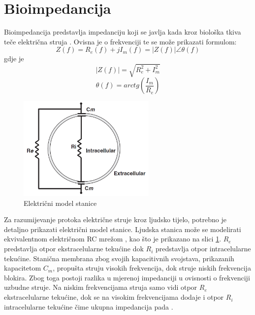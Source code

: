 \documentclass[../diplomski_rad.tex]{subfiles}
\begin{document}
\sloppy

\justifying

\section{Bioimpedancija}

Bioimpedancija predstavlja impedanciju koji se javlja kada kroz biološka tkiva teče električna struja \cite{Bera2014}.
Ovisna je o frekvenciji te se može prikazati formulom:
\begin{equation}
    \label{jed:cpe}
    Z(f) = R_{e}(f) + jI_{m}(f) = |Z(f)|\angle\theta(f) 
\end{equation}
gdje je
\begin{equation}
    \label{jed:cpe}
    |Z(f)| = \sqrt{R_{e}^{2} + I_{m}^{2}}
\end{equation} 
\begin{equation}
    \label{jed:cpe}
    \theta(f) = arctg(\frac{I_{m}}{R_{e}})
\end{equation} 

\begin{figure}[htb]
    \centering
    \includegraphics[width=0.6\textwidth]{Figures/stanica.png} 
    \caption{Električni model stanice \cite{Lukaski2013}}
    \label{slk:stanica}
\end{figure}
Za razumijevanje protoka električne struje kroz ljudsko tijelo, potrebno je detaljno prikazati električni model stanice.
Ljudska stanica može se modelirati ekvivalentnom električnom RC mrežom \cite{Lukaski2013}, 
kao što je prikazano na slici \ref{slk:stanica}. 
$R_{e}$ predstavlja otpor ekstracelularne tekućine dok $R_{i}$ predstavlja otpor intracelularne tekućine.
Stanična membrana zbog svojih kapacitivnih svojstava, prikazanih kapacitetom $C_{m}$, 
propušta struju visokih frekvencija, dok struje niskih frekvencija blokira. 
Zbog toga postoji razlika u mjerenoj impedanciji u ovisnosti o frekvenciji uzbudne struje. 
Na niskim frekvencijama struja samo vidi otpor $R_{e}$ ekstracelularne tekućine, dok se na visokim frekvencijama dodaje i otpor 
$R_{i}$ intracelularne tekućine čime ukupna impedancija pada \cite{Bera2014}.
\end{document}
